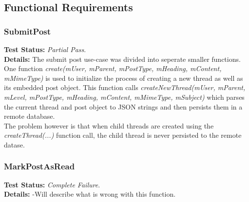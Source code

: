 \subsection{Functional Requirements}
\begin{flushleft}

\subsubsection{SubmitPost}
\begin{flushleft}
\textbf{Test Status:} \emph{Partial Pass}. \\

\textbf{Details:}
The submit post use-case was divided into seperate smaller functions. One function \emph{create(mUser, mParent, mPostType, mHeading, mContent, mMimeType)} is used to initialize the process of creating a new thread as well as its embedded post object. This function calls \emph{createNewThread(mUser, mParent, mLevel, mPostType, mHeading, mContent, mMimeType, mSubject)} which parses the current thread and post object to JSON strings and then persists them in a remote database.\\
The problem however is that when child threads are created using the \emph{createThread(...)} function call, the child thread is never persisted to the remote datase.

\end{flushleft}
\subsubsection{MarkPostAsRead}
\begin{flushleft}
\textbf{Test Status:} \emph{Complete Failure}. \\

\textbf{Details:} -Will describe what is wrong with this function.
\end{flushleft}


\end{flushleft}